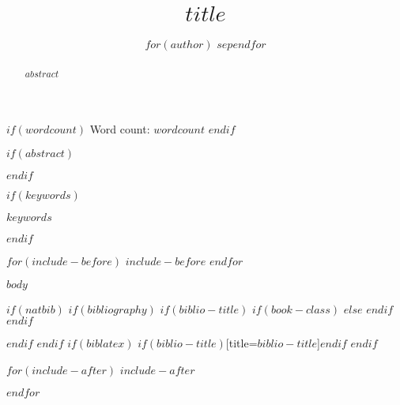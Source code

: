 \documentclass[$for(classoption)$$classoption$$sep$,$endfor$]{glossa}
\title[$if(shorttitle)$$shorttitle$$endif$]{$title$}
\author[$if(shortauthors)$$shortauthors$$endif$]{
  $for(author)$
  \spauthor{$author.name$\\
  \institute{$author.affiliation$}\\
  \small{$author.address$}
  }%
  $sep$\AND$endfor$
}
\begin{document}
\sffamily
\maketitle

$if(wordcount)$
Word count: $wordcount$
$endif$

$if(abstract)$
\begin{abstract}
$abstract$
\end{abstract}
$endif$

$if(keywords)$
\begin{keywords}
  $keywords$
\end{keywords}
$endif$

$for(include-before)$
$include-before$
$endfor$

\rmfamily

$body$

$if(natbib)$
$if(bibliography)$
$if(biblio-title)$
$if(book-class)$
\renewcommand\bibname{$biblio-title$}
$else$
\renewcommand\refname{$biblio-title$}
$endif$
$endif$

$endif$
$endif$
$if(biblatex)$
\printbibliography$if(biblio-title)$[title=$biblio-title$]$endif$
$endif$

$for(include-after)$
$include-after$

$endfor$
\end{document}
